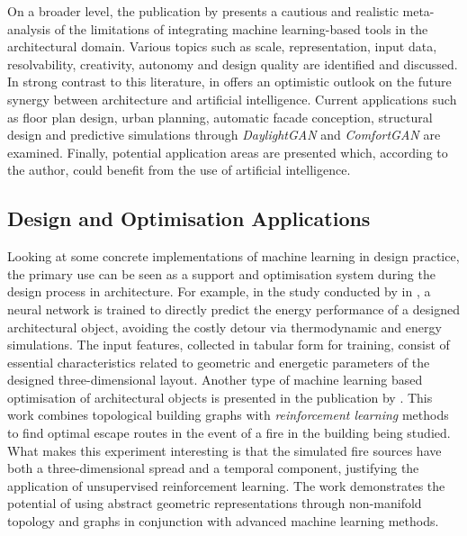 \documentclass[a4paper, 12pt]{report}
\begin{document}
On a broader level, the publication  by \citeauthor{joyce2021limits} presents a cautious and realistic meta-analysis of the limitations of integrating machine learning-based tools in the architectural domain. Various topics such as scale, representation, input data, resolvability, creativity, autonomy and design quality are identified and discussed. In strong contrast to this literature, \citeauthor{chaillou2022artificial} in  offers an optimistic outlook on the future synergy between architecture and artificial intelligence. Current applications such as floor plan design, urban planning, automatic facade conception, structural design and predictive simulations through \textit{DaylightGAN} and \textit{ComfortGAN} are examined. Finally, potential application areas are presented which, according to the author, could benefit from the use of artificial intelligence.

\subsection{Design and Optimisation Applications}\label{subsec:design-and-optimisation-applications}

Looking at some concrete implementations of machine learning in design practice, the primary use can be seen as a support and optimisation system during the design process in architecture. For example, in the study conducted by \citeauthor{hauck2017energy} in \citeyear{hauck2017energy}, a neural network is trained to directly predict the energy performance of a designed architectural object, avoiding the costly detour via thermodynamic and energy simulations. The input features, collected in tabular form for training, consist of essential characteristics related to geometric and energetic parameters of the designed three-dimensional layout. Another type of machine learning based optimisation of architectural objects is presented in the publication  by \citeauthor{jabi2019synergy}. This work combines topological building graphs with \textit{reinforcement learning} methods to find optimal escape routes in the event of a fire in the building being studied. What makes this experiment interesting is that the simulated fire sources have both a three-dimensional spread and a temporal component, justifying the application of unsupervised reinforcement learning. The work demonstrates the potential of using abstract geometric representations through non-\gls{manifold} topology and graphs in conjunction with advanced machine learning methods.
\end{document}
